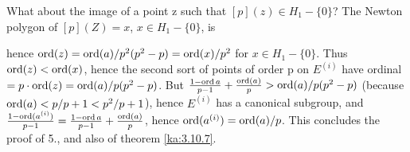 \begin{kaproof}
What about the image of a point z such that $[p](z)\in H_1-\{0\}$? The Newton
polygon of $[p](Z) = x$, $x\in H_1-\{0\}$, is
\begin{center}
\end{center}
hence $\operatorname{ord}(z) = \operatorname{ord}(a)/p^2(p^2-p) = \operatorname{ord}(x)/p^2$ for $x\in H_1-\{0\}$. Thus
$\operatorname{ord}(z)<\operatorname{ord}(x)$, hence the second sort of points of order p on $E^{(i)}$ have
ordinal $= p\cdot\operatorname{ord}(z) = \operatorname{ord}(a)/p(p^2-p)$. But
$\frac{1-\operatorname{ord} a}{p-1} + \frac{\operatorname{ord}(a)}{p} > \operatorname{ord}(a)/p(p^2-p)$ (because
$\operatorname{ord}(a)<p/p+1<p^2/p+1$), hence $E^{(i)}$ has a canonical subgroup, and
$\frac{1-\operatorname{ord}(a^{(i)})}{p-1} = \frac{1-\operatorname{ord} a}{p-1} + \frac{\operatorname{ord}(a)}{p}$, hence
$\operatorname{ord}(a^{(i)}) = \operatorname{ord}(a)/p$. This concludes the proof of 5., and also of
theorem \eqref{ka:3.10.7}.
\end{kaproof}


